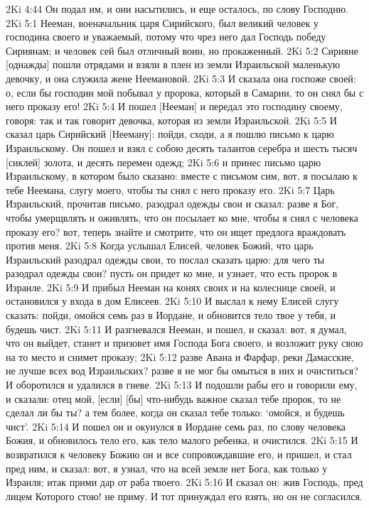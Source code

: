 2Ki 4:44  Он подал им, и они насытились, и еще осталось, по слову Господню.
2Ki 5:1  Нееман, военачальник царя Сирийского, был великий человек у господина своего и уважаемый, потому что чрез него дал Господь победу Сириянам; и человек сей был отличный воин, но прокаженный.
2Ki 5:2  Сирияне [однажды] пошли отрядами и взяли в плен из земли Израильской маленькую девочку, и она служила жене Неемановой.
2Ki 5:3  И сказала она госпоже своей: о, если бы господин мой побывал у пророка, который в Самарии, то он снял бы с него проказу его!
2Ki 5:4  И пошел [Нееман] и передал это господину своему, говоря: так и так говорит девочка, которая из земли Израильской.
2Ki 5:5  И сказал царь Сирийский [Нееману]: пойди, сходи, а я пошлю письмо к царю Израильскому. Он пошел и взял с собою десять талантов серебра и шесть тысяч [сиклей] золота, и десять перемен одежд;
2Ki 5:6  и принес письмо царю Израильскому, в котором было сказано: вместе с письмом сим, вот, я посылаю к тебе Неемана, слугу моего, чтобы ты снял с него проказу его.
2Ki 5:7  Царь Израильский, прочитав письмо, разодрал одежды свои и сказал: разве я Бог, чтобы умерщвлять и оживлять, что он посылает ко мне, чтобы я снял с человека проказу его? вот, теперь знайте и смотрите, что он ищет предлога враждовать против меня.
2Ki 5:8  Когда услышал Елисей, человек Божий, что царь Израильский разодрал одежды свои, то послал сказать царю: для чего ты разодрал одежды свои? пусть он придет ко мне, и узнает, что есть пророк в Израиле.
2Ki 5:9  И прибыл Нееман на конях своих и на колеснице своей, и остановился у входа в дом Елисеев.
2Ki 5:10  И выслал к нему Елисей слугу сказать: пойди, омойся семь раз в Иордане, и обновится тело твое у тебя, и будешь чист.
2Ki 5:11  И разгневался Нееман, и пошел, и сказал: вот, я думал, что он выйдет, станет и призовет имя Господа Бога своего, и возложит руку свою на то место и снимет проказу;
2Ki 5:12  разве Авана и Фарфар, реки Дамасские, не лучше всех вод Израильских? разве я не мог бы омыться в них и очиститься? И оборотился и удалился в гневе.
2Ki 5:13  И подошли рабы его и говорили ему, и сказали: отец мой, [если] [бы] что-нибудь важное сказал тебе пророк, то не сделал ли бы ты? а тем более, когда он сказал тебе только: `омойся, и будешь чист'.
2Ki 5:14  И пошел он и окунулся в Иордане семь раз, по слову человека Божия, и обновилось тело его, как тело малого ребенка, и очистился.
2Ki 5:15  И возвратился к человеку Божию он и все сопровождавшие его, и пришел, и стал пред ним, и сказал: вот, я узнал, что на всей земле нет Бога, как только у Израиля; итак прими дар от раба твоего.
2Ki 5:16  И сказал он: жив Господь, пред лицем Которого стою! не приму. И тот принуждал его взять, но он не согласился.
